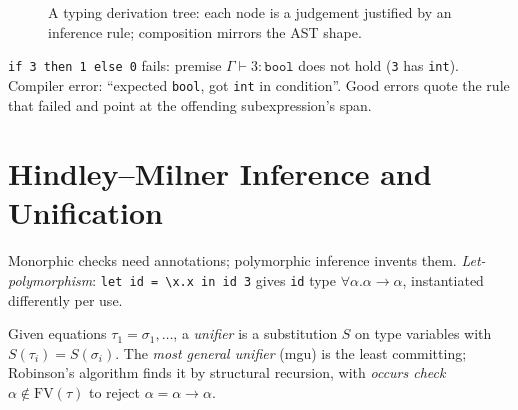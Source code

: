\begin{figure}[h]
\centering
{}
\caption{A typing derivation tree: each node is a judgement justified by an inference rule; composition mirrors the AST shape.}
\label{fig:typing-deriv}
\end{figure}

\begin{example}
\texttt{if 3 then 1 else 0} fails: premise $\Gamma\vdash 3:\texttt{bool}$ does not hold (\texttt{3} has \texttt{int}). Compiler error: ``expected \texttt{bool}, got \texttt{int} in condition''. Good errors quote the rule that failed and point at the offending subexpression's span.
\end{example}

\section{Hindley--Milner Inference and Unification}
\label{sec:hm}
Monorphic checks need annotations; polymorphic inference invents them. \emph{Let-polymorphism}: \texttt{let id = \textbackslash x.x in id 3} gives \texttt{id} type $\forall\alpha.\alpha\to\alpha$, instantiated differently per use.

\begin{definition}[Unification]
Given equations $\tau_1=\sigma_1,\dots$, a \emph{unifier} is a substitution $S$ on type variables with $S(\tau_i)=S(\sigma_i)$. The \emph{most general unifier} (mgu) is the least committing; Robinson's algorithm finds it by structural recursion, with \emph{occurs check} $\alpha\notin\text{FV}(\tau)$ to reject $\alpha=\alpha\to\alpha$.
\end{definition}

